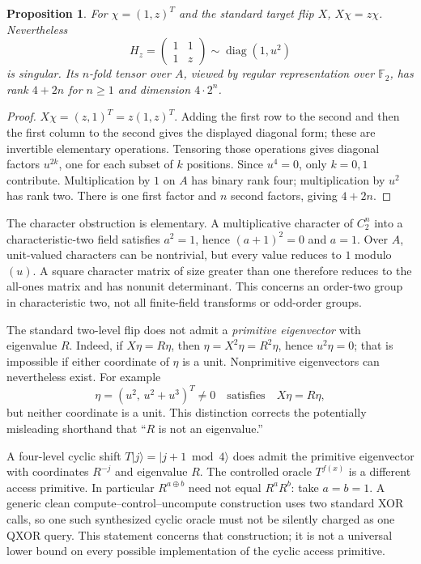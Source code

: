 \documentclass[11pt]{article}
\newtheorem{proposition}[theorem]{Proposition}
\newcommand{\F}{\mathbb F}
\DeclareMathOperator{\diag}{diag}
\begin{document}
\begin{proposition}\label{prop:phase}
For $\chi=(1,z)^T$ and the standard target flip $X$, $X\chi=z\chi$. Nevertheless
\[
 H_z=\begin{pmatrix}1&1\\1&z\end{pmatrix}
       \sim\diag(1,u^2)
\]
is singular. Its $n$-fold tensor over $A$, viewed by regular representation over $\F_2$, has rank $4+2n$ for $n\ge1$ and dimension $4\cdot2^n$.
\end{proposition}
\begin{proof}
$X\chi=(z,1)^T=z(1,z)^T$. Adding the first row to the second and then the first column to the second gives the displayed diagonal form; these are invertible elementary operations. Tensoring those operations gives diagonal factors $u^{2k}$, one for each subset of $k$ positions. Since $u^4=0$, only $k=0,1$ contribute. Multiplication by $1$ on $A$ has binary rank four; multiplication by $u^2$ has rank two. There is one first factor and $n$ second factors, giving $4+2n$.
\end{proof}



The character obstruction is elementary. A multiplicative character of $C_2^n$ into a characteristic-two field satisfies $a^2=1$, hence $(a+1)^2=0$ and $a=1$. Over $A$, unit-valued characters can be nontrivial, but every value reduces to $1$ modulo $(u)$. A square character matrix of size greater than one therefore reduces to the all-ones matrix and has nonunit determinant. This concerns an order-two group in characteristic two, not all finite-field transforms or odd-order groups.

The standard two-level flip does not admit a \emph{primitive eigenvector} with eigenvalue $R$. Indeed, if $X\eta=R\eta$, then $\eta=X^2\eta=R^2\eta$, hence $u^2\eta=0$; that is impossible if either coordinate of $\eta$ is a unit. Nonprimitive eigenvectors can nevertheless exist. For example
\[
 \eta=(u^2,\,u^2+u^3)^T\ne0
 \quad\text{satisfies}\quad
 X\eta=R\eta,
\]
but neither coordinate is a unit. This distinction corrects the potentially misleading shorthand that ``$R$ is not an eigenvalue.''

A four-level cyclic shift $T\lvert j\rangle=\lvert j+1\bmod4\rangle$ does admit the primitive eigenvector with coordinates $R^{-j}$ and eigenvalue $R$. The controlled oracle $T^{f(x)}$ is a different access primitive. In particular $R^{a\mathbin\oplus b}$ need not equal $R^aR^b$: take $a=b=1$. A generic clean compute--control--uncompute construction uses two standard XOR calls, so one such synthesized cyclic oracle must not be silently charged as one QXOR query. This statement concerns that construction; it is not a universal lower bound on every possible implementation of the cyclic access primitive.
\end{document}
